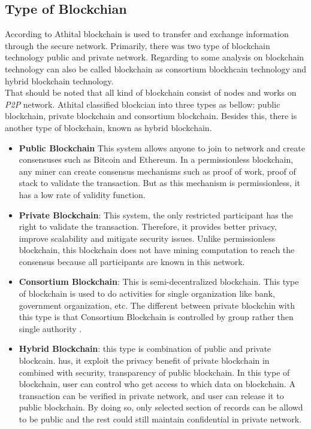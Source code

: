 \subsection{Type of Blockchian}
According to Athital\cite{Athital} blockchain is used to transfer and exchange information through the secure network. Primarily, there was two type of blockchain technology public and private network. Regarding to some analysis on blockchain technology can also be called blockchain as consortium blockhcain technology and hybrid blockchain technology. \\
That should be noted that all kind of blockchain consist of nodes and works on \textit{P2P} network. Athital \cite{Athital} classified blockcian into three types as bellow: public blockchain, private blockchain and consortium blockchain. Besides this, there is another type of blockchain, known as hybrid blockchain.
\begin{itemize}
    \item \textbf{Public Blockchain}
    This system allows anyone to join to network and create consensuses such as Bitcoin and Ethereum. In a permissionless blockchain, any miner can create consensus mechanisms such as proof of work, proof of stack to validate the transaction. But as this mechanism is permissionless, it has a low rate of validity function\cite{Kalra}.
    \item \textbf{Private Blockchain}: This system, the only restricted participant has the right to validate the transaction. Therefore, it provides better privacy, improve  scalability and mitigate security issues. Unlike permissionless blockchain, this blockchain does not have mining computation to reach the consensus because all participants are known in this network\cite{Kalra}. 
    \item \textbf{Consortium Blockchain}: This is semi-decentralized blockchain. This type of blockchain is used to do activities for single organization like bank, government organization, etc. The different between private blockchin with this type is that Consortium Blockchain is controlled by group rather then single authority \cite{Athital}.
    \item \textbf{Hybrid Blockchain}: this type is combination of public and private blockcain. hus, it exploit the privacy benefit of private blockchain in combined with security, transparency of public blockchain. In this type of blockchain, user can control who get access to which data on blockchain. A transaction can be verified in private network, and user can release it to public blockchain. By doing so, only selected section of records can be allowd to be public and the rest could still maintain confidential in private network\cite{Athital}. 
\end{itemize}

